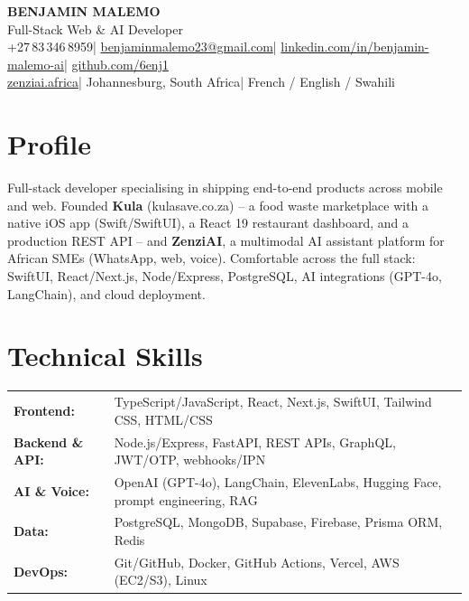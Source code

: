 \documentclass[a4paper,9.5pt]{extarticle}
\begin{document}
\begin{center}
{\Large\bfseries\color{heading} BENJAMIN MALEMO}\\\vspace{2pt}
{\small Full-Stack Web \& AI Developer}\\\vspace{3pt}
{\small
+27\,83\,346\,8959\enspace|\enspace
\href{mailto:benjaminmalemo23@gmail.com}{benjaminmalemo23@gmail.com}\enspace|\enspace
\href{https://linkedin.com/in/benjamin-malemo-ai}{linkedin.com/in/benjamin-malemo-ai}\enspace|\enspace
\href{https://github.com/6enj1}{github.com/6enj1}\\[2pt]
\href{https://zenziai.africa}{zenziai.africa}\enspace|\enspace
Johannesburg, South Africa\enspace|\enspace
French / English / Swahili}
\end{center}
\vspace{-2pt}

\section{Profile}
{\small Full-stack developer specialising in shipping end-to-end products across mobile and web. Founded \textbf{Kula} (kulasave.co.za) -- a food waste marketplace with a native iOS app (Swift/SwiftUI), a React 19 restaurant dashboard, and a production REST API -- and \textbf{ZenziAI}, a multimodal AI assistant platform for African SMEs (WhatsApp, web, voice). Comfortable across the full stack: SwiftUI, React/Next.js, Node/Express, PostgreSQL, AI integrations (GPT-4o, LangChain), and cloud deployment.}

\section{Technical Skills}
{\small
\begin{tabular}{@{}l@{\hskip 8pt}l@{}}
\textbf{Frontend:}      & TypeScript/JavaScript, React, Next.js, SwiftUI, Tailwind CSS, HTML/CSS \\
\textbf{Backend \& API:} & Node.js/Express, FastAPI, REST APIs, GraphQL, JWT/OTP, webhooks/IPN \\
\textbf{AI \& Voice:}    & OpenAI (GPT-4o), LangChain, ElevenLabs, Hugging Face, prompt engineering, RAG \\
\textbf{Data:}           & PostgreSQL, MongoDB, Supabase, Firebase, Prisma ORM, Redis \\
\textbf{DevOps:}         & Git/GitHub, Docker, GitHub Actions, Vercel, AWS (EC2/S3), Linux \\
\end{tabular}}
\end{document}
